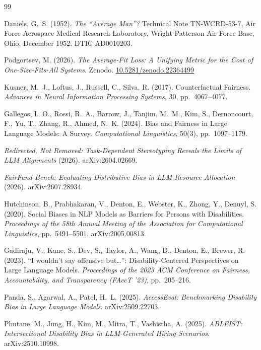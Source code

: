 \documentclass[11pt]{article}
\begin{document}
\begin{thebibliography}{99}

 Daniels, G.\ S. (1952). \emph{The ``Average Man''?}
Technical Note TN-WCRD-53-7, Air Force Aerospace Medical Research Laboratory,
Wright-Patterson Air Force Base, Ohio, December 1952. DTIC AD0010203.

 Podgortsev, M. (2026). \emph{The Average-Fit Loss: A Unifying
Metric for the Cost of One-Size-Fits-All Systems}. Zenodo.
\href{https://doi.org/10.5281/zenodo.22364499}{10.5281/zenodo.22364499}

 Kusner, M.\ J., Loftus, J., Russell, C., Silva, R.
(2017). Counterfactual Fairness. \emph{Advances in Neural Information
Processing Systems}, 30, pp.\ 4067--4077.

 Gallegos, I.\ O., Rossi, R.\ A., Barrow, J., Tanjim,
M.\ M., Kim, S., Dernoncourt, F., Yu, T., Zhang, R., Ahmed, N.\ K. (2024). Bias
and Fairness in Large Language Models: A Survey. \emph{Computational
Linguistics}, 50(3), pp.\ 1097--1179.

 \emph{Redirected, Not Removed: Task-Dependent
Stereotyping Reveals the Limits of LLM Alignments} (2026). arXiv:2604.02669.

 \emph{FairFund-Bench: Evaluating Distributive Bias in
LLM Resource Allocation} (2026). arXiv:2607.28934.

 Hutchinson, B., Prabhakaran, V., Denton, E., Webster,
K., Zhong, Y., Denuyl, S. (2020). Social Biases in NLP Models as Barriers for
Persons with Disabilities. \emph{Proceedings of the 58th Annual Meeting of the
Association for Computational Linguistics}, pp.\ 5491--5501. arXiv:2005.00813.

 Gadiraju, V., Kane, S., Dev, S., Taylor, A., Wang, D.,
Denton, E., Brewer, R. (2023). ``I wouldn't say offensive but\ldots'':
Disability-Centered Perspectives on Large Language Models. \emph{Proceedings of
the 2023 ACM Conference on Fairness, Accountability, and Transparency (FAccT
'23)}, pp.\ 205--216.

 Panda, S., Agarwal, A., Patel, H.\ L. (2025).
\emph{AccessEval: Benchmarking Disability Bias in Large Language Models}.
arXiv:2509.22703.

 Phutane, M., Jung, H., Kim, M., Mitra, T., Vashistha, A.
(2025). \emph{ABLEIST: Intersectional Disability Bias in LLM-Generated Hiring
Scenarios}. arXiv:2510.10998.


\end{thebibliography}
\end{document}
